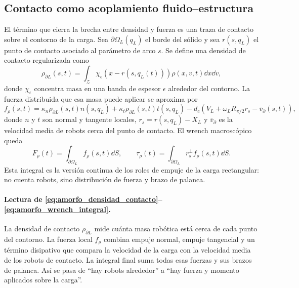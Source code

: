 \subsection{Contacto como acoplamiento fluido--estructura}
\label{subsec:amorfo-contacto}

El término que cierra la brecha entre densidad y fuerza es una traza de contacto sobre el
contorno de la carga. Sea $\partial\Omega_L(q_L)$ el borde del sólido y sea
$r(s,q_L)$ el punto de contacto asociado al parámetro de arco $s$. Se define una densidad
de contacto regularizada como
\begin{equation}
  \rho_{\partial L}(s,t)
  =
  \int_{\mathcal Z}
  \chi_\epsilon\!\left(x-r(s,q_L(t))\right)
  \rho(x,v,t)\dd x\dd v ,
  \label{eq:amorfo_densidad_contacto}
\end{equation}
donde $\chi_\epsilon$ concentra masa en una banda de espesor $\epsilon$ alrededor del
contorno. La fuerza distribuida que esa masa puede aplicar se aproxima por
\begin{equation}
  f_\rho(s,t)
  =
  \kappa_n\rho_{\partial L}(s,t)n(s,q_L)
  +
  \kappa_t\rho_{\partial L}(s,t)t(s,q_L)
  -
  d_c\left(V_L+ \omega_L R_{\pi/2}r_s-\bar v_{\partial}(s,t)\right),
  \label{eq:amorfo_fuerza_contacto}
\end{equation}
donde $n$ y $t$ son normal y tangente locales, $r_s=r(s,q_L)-X_L$ y
$\bar v_{\partial}$ es la velocidad media de robots cerca del punto de contacto. El wrench
macroscópico queda
\begin{equation}
  F_\rho(t)=\int_{\partial\Omega_L}f_\rho(s,t)\dd S,
  \qquad
  \tau_\rho(t)=
  \int_{\partial\Omega_L}r_s^\perp f_\rho(s,t)\dd S .
  \label{eq:amorfo_wrench_integral}
\end{equation}
Esta integral es la versión continua de los roles de empuje de la carga rectangular: no
cuenta robots, sino distribución de fuerza y brazo de palanca.

\paragraph{Lectura de \eqref{eq:amorfo_densidad_contacto}--\eqref{eq:amorfo_wrench_integral}.}
La densidad de contacto $\rho_{\partial L}$ mide cuánta masa robótica está cerca de cada
punto del contorno. La fuerza local $f_\rho$ combina empuje normal, empuje tangencial y
un término disipativo que compara la velocidad de la carga con la velocidad media de los
robots de contacto. La integral final suma todas esas fuerzas y sus brazos de palanca.
Así se pasa de ``hay robots alrededor'' a ``hay fuerza y momento aplicados sobre la
carga''.

